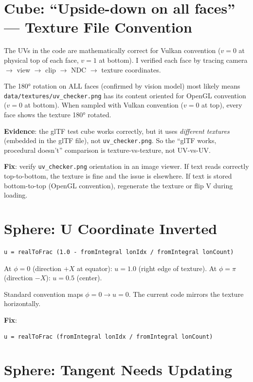 \documentclass{article}
\begin{document}
\section{Cube: ``Upside-down on all faces'' --- Texture File Convention}

The UVs in the code are mathematically correct for Vulkan convention
($v{=}0$ at physical top of each face, $v{=}1$ at bottom). I verified each face
by tracing camera $\to$ view $\to$ clip $\to$ NDC $\to$ texture coordinates.

The 180° rotation on ALL faces (confirmed by vision model) most likely means
\texttt{data/textures/uv\_checker.png} has its content oriented for OpenGL convention
($v{=}0$ at bottom). When sampled with Vulkan convention ($v{=}0$ at top),
every face shows the texture 180° rotated.

\textbf{Evidence}: the glTF test cube works correctly, but it uses
\emph{different textures} (embedded in the glTF file), not \texttt{uv\_checker.png}.
So the ``glTF works, procedural doesn't'' comparison is texture-vs-texture,
not UV-vs-UV.

\textbf{Fix}: verify \texttt{uv\_checker.png} orientation in an image viewer.
If text reads correctly top-to-bottom, the texture is fine and the issue is elsewhere.
If text is stored bottom-to-top (OpenGL convention), regenerate the texture or
flip V during loading.

\section{Sphere: U Coordinate Inverted}

\begin{verbatim}
u = realToFrac (1.0 - fromIntegral lonIdx / fromIntegral lonCount)
\end{verbatim}

At $\phi = 0$ (direction $+X$ at equator): $u = 1.0$ (right edge of texture).
At $\phi = \pi$ (direction $-X$): $u = 0.5$ (center).

Standard convention maps $\phi = 0 \to u = 0$. The current code mirrors the
texture horizontally.

\textbf{Fix}:
\begin{verbatim}
u = realToFrac (fromIntegral lonIdx / fromIntegral lonCount)
\end{verbatim}

\section{Sphere: Tangent Needs Updating}
\end{document}

